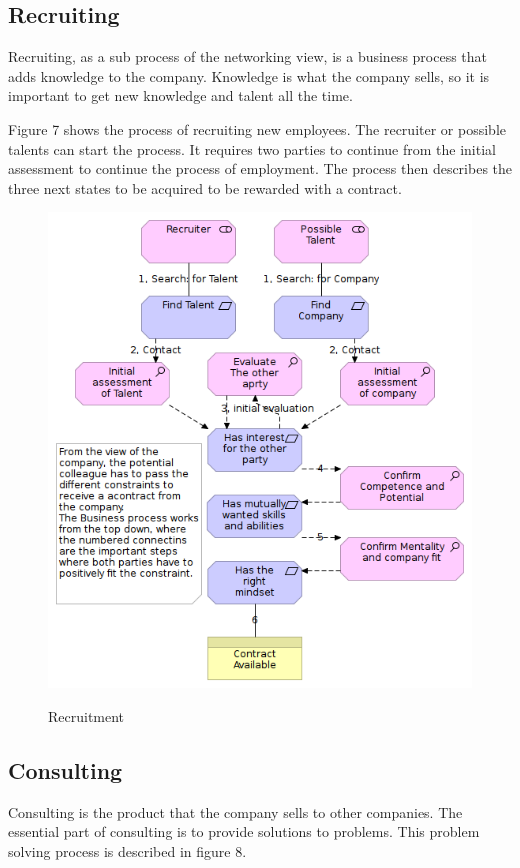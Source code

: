 \documentclass[12pt, a4paper]{article}
\begin{document}
\subsection{Recruiting}
Recruiting, as a sub process of the networking view, is a business process that
adds knowledge to the company. Knowledge is what the company sells, so it is
important to get new knowledge and talent all the time. 

Figure 7 shows the process of recruiting new employees. The recruiter or
possible talents can start the process. It requires two parties to continue
from the initial assessment to continue the process of employment. The process
then describes the three next states to be acquired to be rewarded with a
contract. 

\begin{figure}[htb]
    \centering
    \includegraphics[width=\textwidth]{Recruitment} 
    \label{fig:Recruiting}
    \caption{Recruitment}
\end{figure}

\subsection{Consulting}
Consulting is the product that the company sells to other companies. The
essential part of consulting is to provide solutions to problems. This problem
solving process is described in figure 8.
\end{document}
